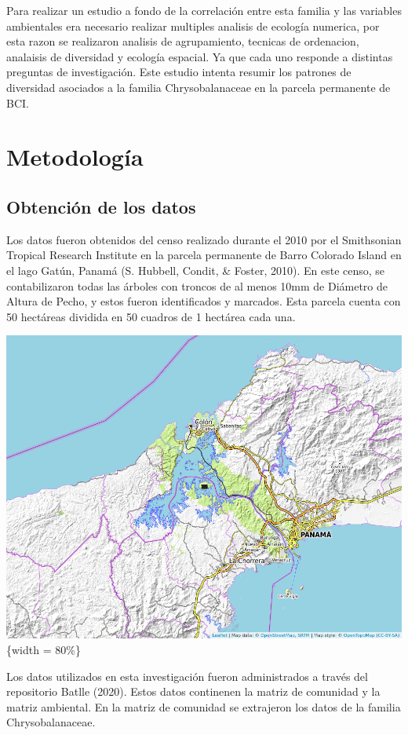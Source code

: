 \documentclass[11pt,]{article}
\begin{document}
Para realizar un estudio a fondo de la correlación entre esta familia y
las variables ambientales era necesario realizar multiples analisis de
ecología numerica, por esta razon se realizaron analisis de
agrupamiento, tecnicas de ordenacion, analaisis de diversidad y ecología
espacial. Ya que cada uno responde a distintas preguntas de
investigación. Este estudio intenta resumir los patrones de diversidad
asociados a la familia Chrysobalanaceae en la parcela permanente de BCI.

\section{Metodología}\label{metodologuxeda}

\subsection{Obtención de los datos}\label{obtenciuxf3n-de-los-datos}

Los datos fueron obtenidos del censo realizado durante el 2010 por el
Smithsonian Tropical Research Institute en la parcela permanente de
Barro Colorado Island en el lago Gatún, Panamá (S. Hubbell, Condit, \&
Foster, 2010). En este censo, se contabilizaron todas las árboles con
troncos de al menos 10mm de Diámetro de Altura de Pecho, y estos fueron
identificados y marcados. Esta parcela cuenta con 50 hectáreas dividida
en 50 cuadros de 1 hectárea cada una.

\includegraphics{mapa_cuadros_panama.png}\{width = 80\%\}

Los datos utilizados en esta investigación fueron administrados a través
del repositorio Batlle (2020). Estos datos continenen la matriz de
comunidad y la matriz ambiental. En la matriz de comunidad se extrajeron
los datos de la familia Chrysobalanaceae.
\end{document}
